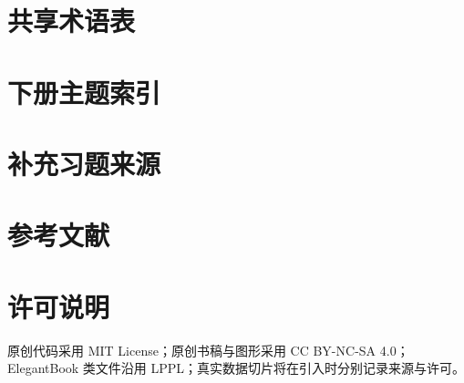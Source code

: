 \documentclass[lang=cn,11pt,scheme=chinese]{elegantbook}
\begin{document}
\chapter{共享术语表}


\chapter{下册主题索引}


\chapter{补充习题来源}


\chapter{参考文献}
\printbibliography[heading=none]

\chapter{许可说明}
原创代码采用 MIT License；原创书稿与图形采用 CC BY-NC-SA 4.0；ElegantBook 类文件沿用 LPPL；真实数据切片将在引入时分别记录来源与许可。
\end{document}
